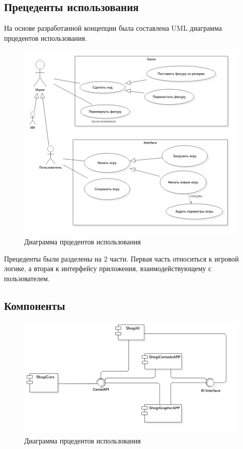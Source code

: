 \subsection{Прецеденты использования}

На основе разработанной концепции была составлена UML диаграмма прцедентов использования.

\begin{figure}[H]
	\begin{center}
		\includegraphics[scale=0.5]{../diagrams/UseCaseDiagram1.png}
		\caption{Диаграмма прцедентов использования}
		\label{pic:use_case}
	\end{center}
\end{figure}

Прецеденты были разделены на 2 части. Первая часть относиться к игровой логике, а вторая к интерфейсу приложения, взаимодействующему с пользователем.

\subsection{Компоненты}

\begin{figure}[H]
	\begin{center}
		\includegraphics[scale=0.5]{../diagrams/ComponentDiagram1.png}
		\caption{Диаграмма прцедентов использования}
		\label{pic:use_case}
	\end{center}
\end{figure}

